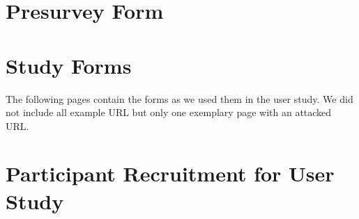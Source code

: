 \section{Presurvey Form}
\label{s:presurvey_form}


\section{Study Forms}
The following pages contain the forms as we used them in the user study. We did not include all example URL but only one exemplary page with an attacked URL.
\label{s:before_survey}

\label{s:url_survey}

\label{s:after_survey}


\section{Participant Recruitment for User Study}
\label{s:participant_recruitment_texts}

